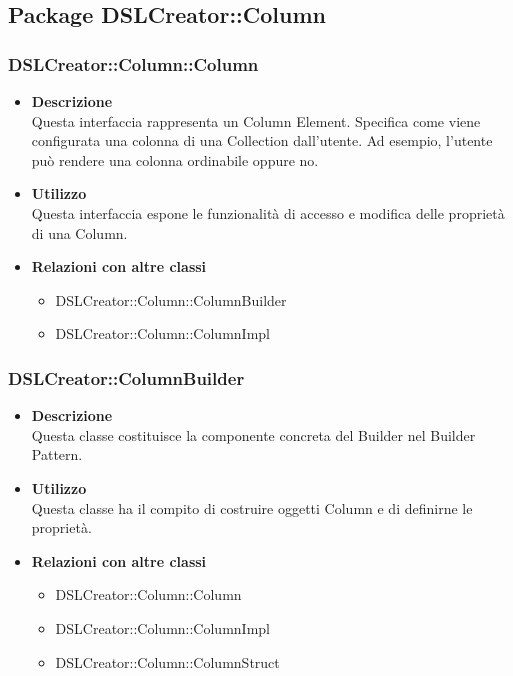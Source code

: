 \subsection{Package DSLCreator::Column}
 \subsubsection{DSLCreator::Column::Column}
                    \begin{itemize}
                        \item \textbf{Descrizione} \hfill \\
                          Questa interfaccia rappresenta un Column Element. Specifica come viene configurata una colonna di una Collection dall'utente. Ad esempio, l'utente può rendere una colonna ordinabile oppure no.
                        \item \textbf{Utilizzo} \hfill \\
                          Questa interfaccia espone le funzionalità di accesso e modifica delle proprietà di una Column.
                        \item \textbf{Relazioni con altre classi}
                            \begin{itemize}
                              \item DSLCreator::Column::ColumnBuilder
                              \item DSLCreator::Column::ColumnImpl
                            \end{itemize}
                    \end{itemize}  

 \subsubsection{DSLCreator::ColumnBuilder}
                    \begin{itemize}
                        \item \textbf{Descrizione} \hfill \\
                          Questa classe costituisce la componente concreta del Builder nel Builder Pattern.
                        \item \textbf{Utilizzo} \hfill \\
                          Questa classe ha il compito di costruire oggetti Column e di definirne le proprietà.
                        \item \textbf{Relazioni con altre classi}
                            \begin{itemize}
                              \item DSLCreator::Column::Column
                              \item DSLCreator::Column::ColumnImpl
                              \item DSLCreator::Column::ColumnStruct
                            \end{itemize}
                    \end{itemize}  

